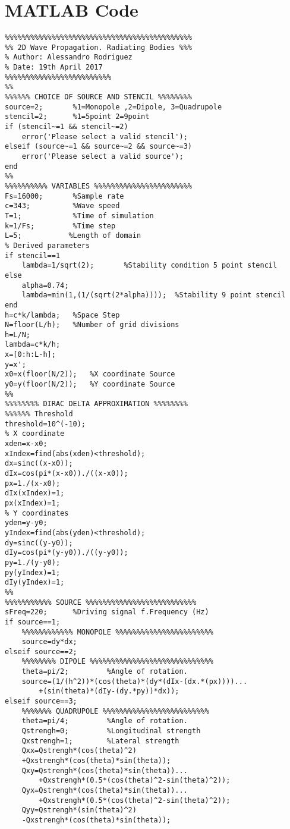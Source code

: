 \chapter{MATLAB Code}
\label{appA}

\begin{lstlisting}
%%%%%%%%%%%%%%%%%%%%%%%%%%%%%%%%%%%%%%%%%%%%
%% 2D Wave Propagation. Radiating Bodies %%%
% Author: Alessandro Rodriguez
% Date: 19th April 2017
%%%%%%%%%%%%%%%%%%%%%%%%%
%%
%%%%%% CHOICE OF SOURCE AND STENCIL %%%%%%%%
source=2;       %1=Monopole ,2=Dipole, 3=Quadrupole
stencil=2;      %1=5point 2=9point
if (stencil~=1 && stencil~=2)
    error('Please select a valid stencil');
elseif (source~=1 && source~=2 && source~=3)
    error('Please select a valid source');
end
%%
%%%%%%%%%% VARIABLES %%%%%%%%%%%%%%%%%%%%%%%
Fs=16000;       %Sample rate
c=343;          %Wave speed
T=1;            %Time of simulation
k=1/Fs;         %Time step
L=5;           %Length of domain
% Derived parameters
if stencil==1
    lambda=1/sqrt(2);       %Stability condition 5 point stencil
else
    alpha=0.74;
    lambda=min(1,(1/(sqrt(2*alpha))));  %Stability 9 point stencil
end
h=c*k/lambda;   %Space Step
N=floor(L/h);   %Number of grid divisions
h=L/N;
lambda=c*k/h;
x=[0:h:L-h];
y=x';
x0=x(floor(N/2));   %X coordinate Source
y0=y(floor(N/2));   %Y coordinate Source
%%
%%%%%%%% DIRAC DELTA APPROXIMATION %%%%%%%%
%%%%%% Threshold 
threshold=10^(-10);
% X coordinate
xden=x-x0;
xIndex=find(abs(xden)<threshold);
dx=sinc((x-x0));
dIx=cos(pi*(x-x0))./((x-x0));
px=1./(x-x0);
dIx(xIndex)=1;
px(xIndex)=1;
% Y coordinates
yden=y-y0;
yIndex=find(abs(yden)<threshold);
dy=sinc((y-y0));
dIy=cos(pi*(y-y0))./((y-y0));
py=1./(y-y0);
py(yIndex)=1;
dIy(yIndex)=1;
%%
%%%%%%%%%%% SOURCE %%%%%%%%%%%%%%%%%%%%%%%%%%
sFreq=220;      %Driving signal f.Frequency (Hz)
if source==1;
    %%%%%%%%%%%% MONOPOLE %%%%%%%%%%%%%%%%%%%%%%%
    source=dy*dx;
elseif source==2;
    %%%%%%%% DIPOLE %%%%%%%%%%%%%%%%%%%%%%%%%%%%%
    theta=pi/2;         %Angle of rotation.
    source=(1/(h^2))*(cos(theta)*(dy*(dIx-(dx.*(px))))...
        +(sin(theta)*(dIy-(dy.*py))*dx));
elseif source==3;
    %%%%%%% QUADRUPOLE %%%%%%%%%%%%%%%%%%%%%%%%%
    theta=pi/4;         %Angle of rotation.
    Qstrengh=0;         %Longitudinal strength
    Qxstrengh=1;        %Lateral strength
    Qxx=Qstrengh*(cos(theta)^2)
	+Qxstrengh*(cos(theta)*sin(theta));
    Qxy=Qstrengh*(cos(theta)*sin(theta))...
        +Qxstrengh*(0.5*(cos(theta)^2-sin(theta)^2));
    Qyx=Qstrengh*(cos(theta)*sin(theta))...
        +Qxstrengh*(0.5*(cos(theta)^2-sin(theta)^2));
    Qyy=Qstrengh*(sin(theta)^2)
	-Qxstrengh*(cos(theta)*sin(theta));


\end{lstlisting}
